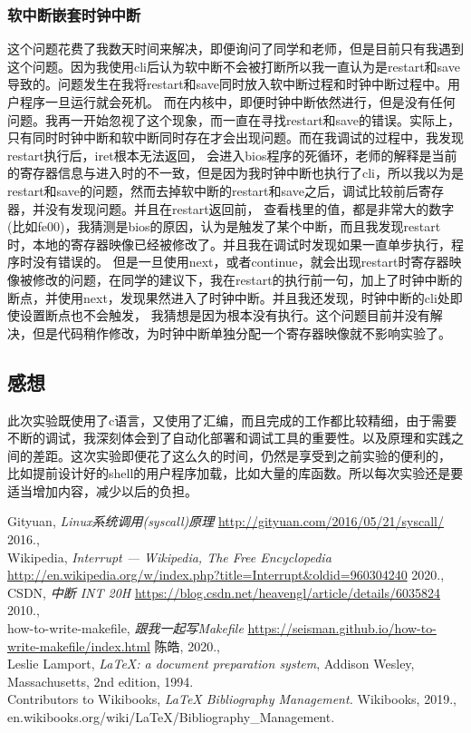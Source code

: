 \documentclass[a4paper, 11pt]{article} %
\begin{document}
\subsubsection{软中断嵌套时钟中断}
这个问题花费了我数天时间来解决，即便询问了同学和老师，但是目前只有我遇到这个问题。因为我使用cli后认为软中断不会被打断所以我一直认为是restart和save导致的。问题发生在我将restart和save同时放入软中断过程和时钟中断过程中。用户程序一旦运行就会死机。
而在内核中，即便时钟中断依然进行，但是没有任何问题。我再一开始忽视了这个现象，而一直在寻找restart和save的错误。实际上，只有同时时钟中断和软中断同时存在才会出现问题。而在我调试的过程中，我发现restart执行后，iret根本无法返回，
会进入bios程序的死循环，老师的解释是当前的寄存器信息与进入时的不一致，但是因为我时钟中断也执行了cli，所以我以为是restart和save的问题，然而去掉软中断的restart和save之后，调试比较前后寄存器，并没有发现问题。并且在restart返回前，
查看栈里的值，都是非常大的数字(比如fe00)，我猜测是bios的原因，认为是触发了某个中断，而且我发现restart时，本地的寄存器映像已经被修改了。并且我在调试时发现如果一直单步执行，程序时没有错误的。
但是一旦使用next，或者continue，就会出现restart时寄存器映像被修改的问题，在同学的建议下，我在restart的执行前一句，加上了时钟中断的断点，并使用next，发现果然进入了时钟中断。并且我还发现，时钟中断的cli处即使设置断点也不会触发，
我猜想是因为根本没有执行。这个问题目前并没有解决，但是代码稍作修改，为时钟中断单独分配一个寄存器映像就不影响实验了。
\subsection{感想}
此次实验既使用了c语言，又使用了汇编，而且完成的工作都比较精细，由于需要不断的调试，我深刻体会到了自动化部署和调试工具的重要性。以及原理和实践之间的差距。这次实验即便花了这么久的时间，仍然是享受到之前实验的便利的，
比如提前设计好的shell的用户程序加载，比如大量的库函数。所以每次实验还是要适当增加内容，减少以后的负担。

\begin{thebibliography}{99}
  
  Gityuan,
  \textit{Linux系统调用(syscall)原理}
  \url{http://gityuan.com/2016/05/21/syscall/}
  2016., \\
  Wikipedia,
  \textit{{Interrupt} --- {W}ikipedia{,} The Free Encyclopedia}
  \url{http://en.wikipedia.org/w/index.php?title=Interrupt&oldid=960304240}
  2020., \\
  CSDN,
  \textit{中断 INT 20H}
  \url{https://blog.csdn.net/heavengl/article/details/6035824}
  2010., \\
  how-to-write-makefile,
  \textit{跟我一起写Makefile}
  \url{https://seisman.github.io/how-to-write-makefile/index.html}
  陈皓,
  2020., \\
  Leslie Lamport,
  \textit{\LaTeX: a document preparation system},
  Addison Wesley, Massachusetts,
  2nd edition,
  1994.   \\
  Contributors to Wikibooks,
  \textit{LaTeX Bibliography Management.}
  Wikibooks,
  2019., \\
  en.wikibooks.org/wiki/LaTeX/Bibliography\_Management.
\end{thebibliography}
 
\end{document}

